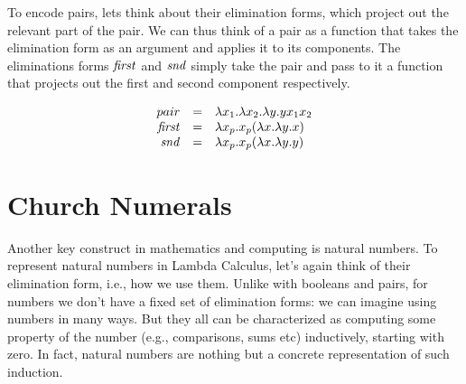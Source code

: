 \begin{gram}
To encode pairs, lets think about their elimination forms, which project out the relevant part of the pair.
%
We can thus think of a pair as a function that takes the elimination form as
an argument and applies it to its components.  
%
The eliminations forms $\mathit{first}$ and $\mathit{snd}$ simply take the
pair and pass to it a function that projects out the first and
second component respectively.

\[
\begin{array}{rcl}
pair & = &  \lambda x_1. \lambda x_2.  \lambda y. y x_1 x_2\\
\mathit{first}  & = & \lambda x_p. x_p (\lambda x. \lambda y. x)\\
\mathit{snd}  & = & \lambda x_p. x_p (\lambda x. \lambda y. y)\\
\end{array}
\]

\end{gram}


\section{Church Numerals}

Another key construct in mathematics and computing is natural numbers.
%
To represent natural numbers in Lambda Calculus, let's again think of their elimination form, i.e., how we use them.
%
Unlike with booleans and pairs, for numbers we don't have a fixed set of elimination forms: we can imagine using numbers in many ways.
%
But they all can be characterized as computing some property of the
number (e.g., comparisons, sums etc) inductively, starting with zero.
%
In fact, natural numbers are nothing but a concrete representation of such induction.

